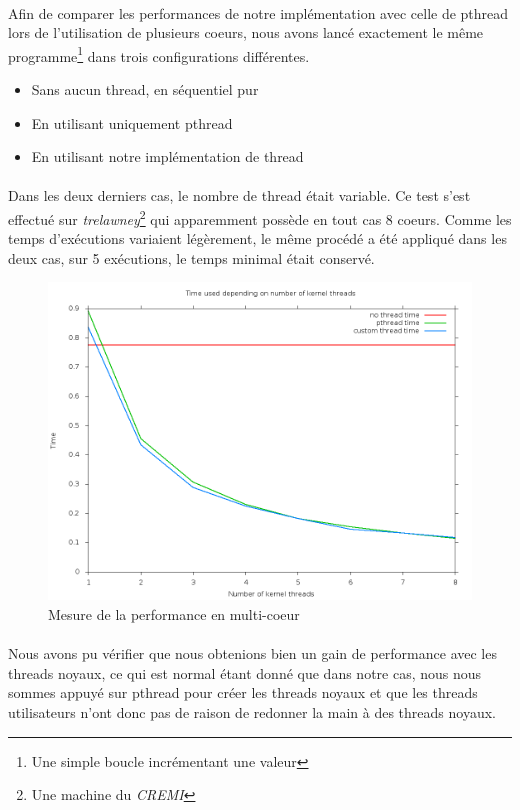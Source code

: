 \documentclass{article}
\begin{document}
    \paragraph{}
    Afin de comparer les performances de notre implémentation avec celle de
    pthread lors de l'utilisation de plusieurs coeurs, nous avons lancé
    exactement le même programme\footnote{Une simple boucle incrémentant une
      valeur} dans trois configurations différentes.
    \begin{itemize}
      \item Sans aucun thread, en séquentiel pur
      \item En utilisant uniquement pthread
      \item En utilisant notre implémentation de thread
    \end{itemize}
    \paragraph{}
    Dans les deux derniers cas, le nombre de thread était variable. Ce test
    s'est effectué sur {\em trelawney}\footnote{Une machine du {\em CREMI}}
    qui apparemment possède en tout cas 8 coeurs. Comme les temps
    d'exécutions variaient légèrement, le même procédé a été appliqué dans
    les deux cas, sur 5 exécutions, le temps minimal était conservé.
    \begin{figure}[H]
      \caption{Mesure de la performance en multi-coeur}
      \includegraphics[width=\textwidth]{compare.png}
    \end{figure}
    \paragraph{}
    Nous avons pu vérifier que nous obtenions bien un gain de performance
    avec les threads noyaux, ce qui est normal étant donné que dans notre
    cas, nous nous sommes appuyé sur pthread pour créer les threads noyaux et
    que les threads utilisateurs n'ont donc pas de raison de redonner la main
    à des threads noyaux.
\end{document}
